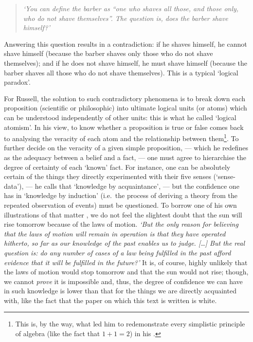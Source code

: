 \begin{quote}
	\textit{‘You can define the barber as “one who shaves all those, and those only, who do not shave themselves”. The question is, does the barber shave himself?’}
\end{quote}

Answering this question results in a contradiction: if he shaves himself, he cannot shave himself (because the barber shaves only those who do not shave themselves); and if he does not shave himself, he must shave himself (because the barber shaves all those who do not shave themselves). This is a typical ‘logical paradox’.

For Russell, the solution to such contradictory phenomena is to break down each proposition (scientific or philosophic) into ultimate logical units (or atoms) which can be understood independently of other units: this is what he called ‘logical atomism’.
In his view, to know whether a proposition is true or false comes back to analysing the veracity of each atom and the relationship between them\footnote{This is, by the way, what led him to redemonstrate every simplistic principle of algebra (like the fact that $1+1=2$) in his \textit{} \citeyearpar{whitehead1912principia}.}.
To further decide on the veracity of a given simple proposition, — which he redefines as the adequacy between a belief and a fact, — 
one must agree to hierarchise the degree of certainty of each ‘known’ fact.
For instance, one can be absolutely certain of the things they directly experimented with their five senses (‘sense-data’), — he calls that ‘knowledge by acquaintance’, — but the confidence one has in ‘knowledge by induction’ (i.e.\ the process of deriving a theory from the repeated observation of events) must be questioned.
To borrow one of his own illustrations of that matter \citep{russell1912problems}, we do not feel the slightest doubt that the sun will rise tomorrow because of the laws of motion.
\textit{‘But the \textit{only} reason for believing that the laws of motion will remain in operation is that they have operated hitherto, so far as our knowledge of the past enables us to judge. […] But the real question is: do any number of cases of a law being fulfilled in the past afford evidence that it will be fulfilled in the future?’}
It is, of course, highly unlikely that the laws of motion would stop tomorrow and that the sun would not rise; though, we cannot \textit{prove} it is impossible and, thus, the degree of confidence we can have in such knowledge is lower than that for the things we are directly acquainted with, like the fact that the paper on which this text is written is white.

